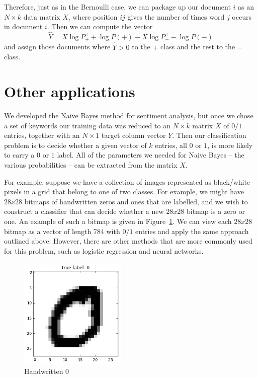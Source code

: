 \documentclass[
  11pt,
  letterpaper,
]{scrbook}
\theoremstyle{plain}
\theoremstyle{plain}
\theoremstyle{remark}
\begin{document}
Therefore, just as in the Bernoulli case, we can package up our document
\(i\) as an \(N\times k\) data matrix \(X\), where position \(ij\) gives
the number of times word \(j\) occurs in document \(i\). Then we can
compute the vector \[
\hat{Y} = X\log P_{+}^{\intercal} + \log P(+)-X\log P_{-}^{\intercal} - \log P(-)
\] and assign those documents where \(\hat{Y}>0\) to the \(+\) class and
the rest to the \(-\) class.

\hypertarget{other-applications}{%
\section{Other applications}\label{other-applications}}

We developed the Naive Bayes method for sentiment analysis, but once we
chose a set of keywords our training data was reduced to an
\(N\times k\) matrix \(X\) of \(0/1\) entries, together with an
\(N\times 1\) target column vector \(Y\). Then our classification
problem is to decide whether a given vector of \(k\) entries, all \(0\)
or \(1\), is more likely to carry a \(0\) or \(1\) label. All of the
parameters we needed for Naive Bayes -- the various probabilities -- can
be extracted from the matrix \(X\).

For example, suppose we have a collection of images represented as
black/white pixels in a grid that belong to one of two classes. For
example, we might have \(28x28\) bitmaps of handwritten zeros and ones
that are labelled, and we wish to construct a classifier that can decide
whether a new \(28x28\) bitmap is a zero or one. An example of such a
bitmap is given in Figure~\ref{fig-mnist0}. We can view each \(28x28\)
bitmap as a vector of length \(784\) with \(0/1\) entries and apply the
same approach outlined above. However, there are other methods that are
more commonly used for this problem, such as logistic regression and
neural networks.

\begin{figure}

{\centering \includegraphics[width=2in,height=\textheight]{chapters/img/mnist_data_10_0.png}

}

\caption{\label{fig-mnist0}Handwritten 0}

\end{figure}
\end{document}
